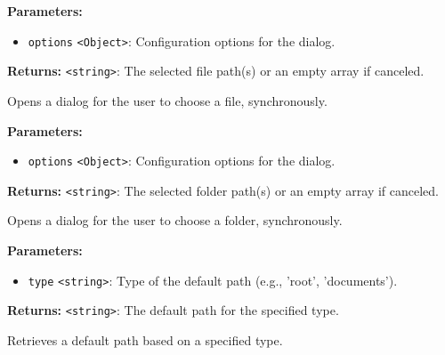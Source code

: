 \documentclass[12pt,a4paper]{article}
\begin{document}
\vspace{5mm}
\noindent {}


\noindent \textbf{Parameters:}
\begin{itemize}
  \item \texttt{options} \texttt{<Object>}: Configuration options for the dialog.
\end{itemize}

\noindent \textbf{Returns:} \texttt{<string>}: The selected file path(s) or an empty array if canceled.

\noindent Opens a dialog for the user to choose a file, synchronously.

\vspace{5mm}
\noindent {}


\noindent \textbf{Parameters:}
\begin{itemize}
  \item \texttt{options} \texttt{<Object>}: Configuration options for the dialog.
\end{itemize}

\noindent \textbf{Returns:} \texttt{<string>}: The selected folder path(s) or an empty array if canceled.

\noindent Opens a dialog for the user to choose a folder, synchronously.

\vspace{5mm}
\noindent {}


\noindent \textbf{Parameters:}
\begin{itemize}
  \item \texttt{type} \texttt{<string>}: Type of the default path (e.g., 'root', 'documents').
\end{itemize}

\noindent \textbf{Returns:} \texttt{<string>}: The default path for the specified type.

\noindent Retrieves a default path based on a specified type.

\vspace{5mm}
\noindent {}
\end{document}
